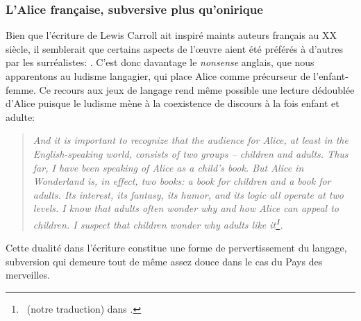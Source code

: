\subsubsection{L'Alice française, subversive plus qu'onirique}
Bien que l'écriture de Lewis Carroll ait inspiré maints auteurs français au XX siècle, il semblerait que certains aspects de l'\oe{}uvre aient été préférés à d'autres par les surréalistes: .
C'est donc davantage le \textit{nonsense} anglais, que nous apparentons au ludisme langagier, qui place Alice comme précurseur de l'enfant-femme.
Ce recours aux jeux de langage rend même possible une lecture dédoublée d'Alice puisque le ludisme mène à la coexistence de discours à la fois enfant et adulte:
\begin{quote}
  \begin{singlespace}
    \small
    \textit{And it is important to recognize that the audience for Alice, at least in the English-speaking world, consists of two groups -- children and adults. Thus far, I have been speaking of Alice as a child's book. But Alice in Wonderland is, in effect, two books: a book for children and a book for adults. Its interest, its fantasy, its humor, and its logic all operate at two levels. I know that adults often wonder why and how Alice can appeal to children. I suspect that children wonder why adults like it\footnote{~(notre traduction) dans \mancite \cite[7]{Weaver1964}.}.}
    \normalsize
  \end{singlespace}
\end{quote}
Cette dualité dans l'écriture constitue une forme de pervertissement du langage, subversion qui demeure tout de même assez douce dans le cas du Pays des merveilles.


